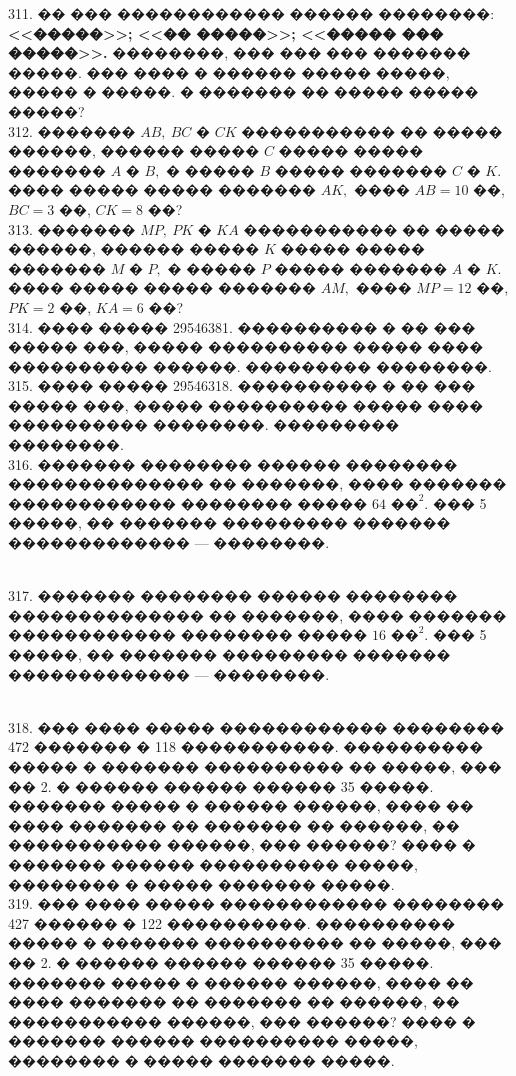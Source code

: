 \documentclass[12pt]{article}
\begin{document}
311. �� ��� ������������ ������ ��������: {\bf <<�����>>; <<�� �����>>; <<����� ��� �����>>.} ��������, ��� ��� ��� ������� �����. ��� ���� � ������ ����� �����, ����� � �����. � ������� �� ����� ����� �����?\\
312. ������� $AB,\ BC$ � $CK$ ����������� �� ����� ������, ������ ����� $C$ ����� ����� ������� $A$ � $B,$ � ����� $B$ ����� ������� $C$ � $K.$���� ����� ����� ������� $AK,$ ���� $AB=10$ ��, $BC=3$ ��, $CK=8$ ��?\\
313. ������� $MP,\ PK$ � $KA$ ����������� �� ����� ������, ������ ����� $K$ ����� ����� ������� $M$ � $P,$ � ����� $P$ ����� ������� $A$ � $K.$���� ����� ����� ������� $AM,$ ���� $MP=12$ ��, $PK=2$ ��, $KA=6$ ��?\\
314. ���� ����� 29546381. ���������� � �� ��� ����� ���, ����� ���������� ����� ���� ���������� ������. ��������� ��������.\\
315. ���� ����� 29546318. ���������� � �� ��� ����� ���, ����� ���������� ����� ���� ���������� ��������. ��������� ��������.\\
316. ������� �������� ������ �������� �������������� �� �������, ���� ������� ������������ �������� ����� $64\text{ ��}^2.$ ��� 5 �����, �� ������� ��������� ������� ������������� --- ��������.\\
\begin{figure}[ht!]
\end{figure}\\
317. ������� �������� ������ �������� �������������� �� �������, ���� ������� ������������ �������� ����� $16\text{ ��}^2.$ ��� 5 �����, �� ������� ��������� ������� ������������� --- ��������.\\
\begin{figure}[ht!]
\end{figure}\\
318. ��� ���� ����� ������������ �������� 472 ������� � 118 �����������. ���������� ����� � ������� ���������� �� �����, ��� �� 2. � ������ ������ ������ 35 �����. ������� ����� � ������ ������, ���� �� ���� ������� �� ������� �� ������, �� ����������� ������, ��� ������? ���� � ������� ������ ���������� �����, �������� � ����� ������� �����.\\
319. ��� ���� ����� ������������ �������� 427 ������ � 122 ����������. ���������� ����� � ������� ���������� �� �����, ��� �� 2. � ������ ������ ������ 35 �����. ������� ����� � ������ ������, ���� �� ���� ������� �� ������� �� ������, �� ����������� ������, ��� ������? ���� � ������� ������ ���������� �����, �������� � ����� ������� �����.\\
\end{document}
